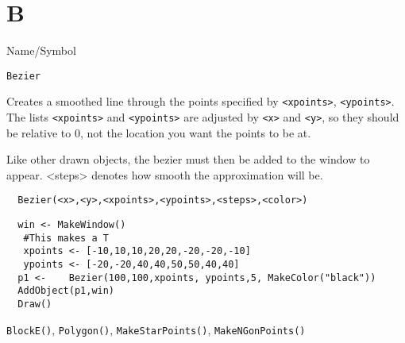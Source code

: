 \rl

\section{B}
\rl

\begin{desc}{Name/Symbol}
\item[Name/Symbol]  	\verb+Bezier+ 

\item[Description] Creates a smoothed line through the  points
specified by \verb+<xpoints>+, \verb+<ypoints>+. The lists \verb+<xpoints>+ and
\verb+<ypoints>+ are adjusted by  \verb+<x>+ and \verb+<y>+, so they
should be relative to 0, not the location you want the points to be at.

Like other drawn objects, the bezier must then be added to the window
to appear. <steps> denotes how smooth the approximation will be.

\item[Usage]		
\begin{verbatim}
  Bezier(<x>,<y>,<xpoints>,<ypoints>,<steps>,<color>)
\end{verbatim}

\item[Example]	
\begin{verbatim}
  win <- MakeWindow()
   #This makes a T
   xpoints <- [-10,10,10,20,20,-20,-20,-10]
   ypoints <- [-20,-20,40,40,50,50,40,40]
  p1 <-    Bezier(100,100,xpoints, ypoints,5, MakeColor("black"))
  AddObject(p1,win)
  Draw()
\end{verbatim}

\item[See Also]   
\verb+BlockE()+, \verb+Polygon()+, \verb+MakeStarPoints()+,
\verb+MakeNGonPoints()+
\end{desc}

\rl


